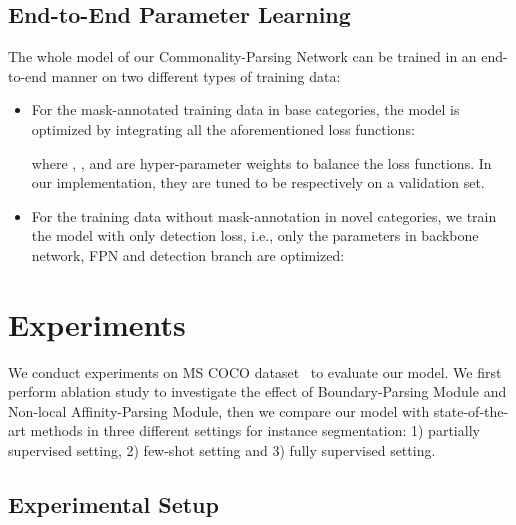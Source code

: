 \documentclass[runningheads]{llncs}
\newcommand{\mymodel}{Commonality-Parsing Network\xspace}
\begin{document}
\subsection{End-to-End Parameter Learning}
The whole model of our \mymodel can be trained in an end-to-end manner on two different types of training data:
\vspace{-1mm}
\begin{itemize}
    \item For the mask-annotated training data in base categories, the model is optimized
by integrating all the aforementioned loss functions:
\begin{small}

\end{small}

\vspace{-3mm}\noindent
where , ,  and  are hyper-parameter weights to balance the loss functions. In our implementation, they are tuned to be  respectively on a validation set. 
\item For the training data without mask-annotation in novel categories, we train the model with only detection loss, i.e., only the parameters in backbone network, FPN and detection branch are optimized:
\begin{small}

\end{small}
\end{itemize}

\vspace{-5mm}



\section{Experiments}
\vspace{-0.05in}

We conduct experiments on MS COCO dataset~\cite{lin2014microsoft} to evaluate our model. We first perform ablation study to investigate the effect of Boundary-Parsing Module and Non-local Affinity-Parsing Module, then we compare our model with state-of-the-art methods in three different settings for instance segmentation: 1) partially supervised setting, 2) few-shot setting and 3) fully supervised setting. 

\vspace{-0.15in}

\subsection{Experimental Setup}
\vspace{-0.05in}
\end{document}
